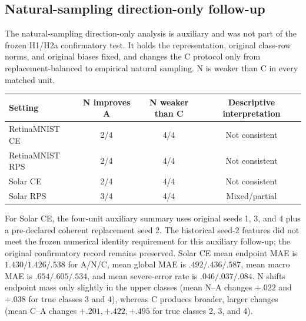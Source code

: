 \subsection{Natural-sampling direction-only follow-up}

The natural-sampling direction-only analysis is auxiliary and was not part of the frozen H1/H2a confirmatory test. It holds the representation, original class-row norms, and original biases fixed, and changes the C protocol only from replacement-balanced to empirical natural sampling. N is weaker than C in every matched unit.

\begin{center}
\begin{tabular}{lccc}
\toprule
Setting & N improves A & N weaker than C & Descriptive interpretation \\
\midrule
RetinaMNIST CE & 2/4 & 4/4 & Not consistent \\
RetinaMNIST RPS & 2/4 & 4/4 & Not consistent \\
Solar CE & 2/4 & 4/4 & Not consistent \\
Solar RPS & 3/4 & 4/4 & Mixed/partial \\
\bottomrule
\end{tabular}
\label{tab:natural-followup}
\end{center}

For Solar CE, the four-unit auxiliary summary uses original seeds 1, 3, and 4 plus a pre-declared coherent replacement seed 2. The historical seed-2 features did not meet the frozen numerical identity requirement for this auxiliary follow-up; the original confirmatory record remains preserved. Solar CE mean endpoint MAE is \(1.430/1.426/.538\) for A/N/C, mean global MAE is \(.492/.436/.587\), mean macro MAE is \(.654/.605/.534\), and mean severe-error rate is \(.046/.037/.084\). N shifts endpoint mass only slightly in the upper classes (mean N--A changes \(+.022\) and \(+.038\) for true classes 3 and 4), whereas C produces broader, larger changes (mean C--A changes \(+.201,+.422,+.495\) for true classes 2, 3, and 4).
